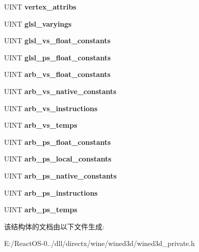 \begin{DoxyCompactItemize}
\mbox{\label{structwined3d__gl__limits_a632f825d9e034ad09e27f2c41e8816e1}} 
U\+I\+NT {\bfseries vertex\+\_\+attribs}
\item 
\mbox{\label{structwined3d__gl__limits_a8a6cd627f39e889a24d2b898d27b1f80}} 
U\+I\+NT {\bfseries glsl\+\_\+varyings}
\item 
\mbox{\label{structwined3d__gl__limits_a99e9f71fb38b2e58a2b09584a4eebd15}} 
U\+I\+NT {\bfseries glsl\+\_\+vs\+\_\+float\+\_\+constants}
\item 
\mbox{\label{structwined3d__gl__limits_aa33eb1655342acc4e6eea0575486daf3}} 
U\+I\+NT {\bfseries glsl\+\_\+ps\+\_\+float\+\_\+constants}
\item 
\mbox{\label{structwined3d__gl__limits_a17902216ce1bdbf4ae52e0b7ddc24842}} 
U\+I\+NT {\bfseries arb\+\_\+vs\+\_\+float\+\_\+constants}
\item 
\mbox{\label{structwined3d__gl__limits_aae917ecac3a12fa9e0f4d3dc4fcd37eb}} 
U\+I\+NT {\bfseries arb\+\_\+vs\+\_\+native\+\_\+constants}
\item 
\mbox{\label{structwined3d__gl__limits_a00f81ca397f5728ee3610206e1cc7a83}} 
U\+I\+NT {\bfseries arb\+\_\+vs\+\_\+instructions}
\item 
\mbox{\label{structwined3d__gl__limits_a47986351d8919b94c993d7a1a6847c6a}} 
U\+I\+NT {\bfseries arb\+\_\+vs\+\_\+temps}
\item 
\mbox{\label{structwined3d__gl__limits_aa0c80da9d4057610f2298f2229a37fd0}} 
U\+I\+NT {\bfseries arb\+\_\+ps\+\_\+float\+\_\+constants}
\item 
\mbox{\label{structwined3d__gl__limits_ae096146a6625e14798d24e1a3f996411}} 
U\+I\+NT {\bfseries arb\+\_\+ps\+\_\+local\+\_\+constants}
\item 
\mbox{\label{structwined3d__gl__limits_a735cdb6135ceecee826f63d13f686ae7}} 
U\+I\+NT {\bfseries arb\+\_\+ps\+\_\+native\+\_\+constants}
\item 
\mbox{\label{structwined3d__gl__limits_a336592b75e77e7e0e28a6cc7272029c9}} 
U\+I\+NT {\bfseries arb\+\_\+ps\+\_\+instructions}
\item 
\mbox{\label{structwined3d__gl__limits_abe212527da417c0ab8b484ca0231e9af}} 
U\+I\+NT {\bfseries arb\+\_\+ps\+\_\+temps}
\end{DoxyCompactItemize}


该结构体的文档由以下文件生成\+:\begin{DoxyCompactItemize}
\item 
E\+:/\+React\+O\+S-\/0../dll/directx/wine/wined3d/wined3d\+\_\+private.\+h\end{DoxyCompactItemize}
